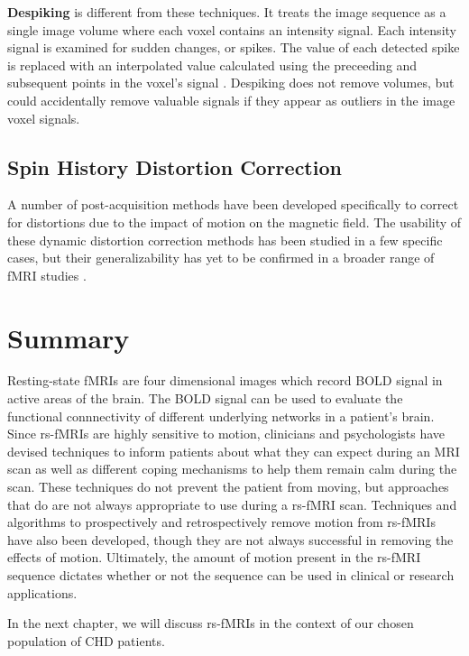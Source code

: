 \textbf{Despiking} is different from these techniques. It treats the image sequence as a single image volume where each voxel contains an intensity signal. Each intensity signal is examined for sudden changes, or spikes. The value of each detected spike is replaced with an interpolated value calculated using the preceeding and subsequent points in the voxel's signal \cite{Jo2013} \cite{Patel2014}. Despiking does not remove volumes, but could accidentally remove valuable signals if they appear as outliers in the image voxel signals.

\subsection{Spin History Distortion Correction}

A number of post-acquisition methods have been developed specifically to correct for distortions due to the impact of motion on the magnetic field. The usability of these dynamic distortion correction methods has been studied in a few specific cases, but their generalizability has yet to be confirmed in a broader range of fMRI studies \cite{Zaitsev2017}.

\section{Summary}

Resting-state fMRIs are four dimensional images which record BOLD signal in active areas of the brain. The BOLD signal can be used to evaluate the functional connnectivity of different underlying networks in a patient's brain. Since rs-fMRIs are highly sensitive to motion, clinicians and psychologists have devised techniques to inform patients about what they can expect during an MRI scan as well as different coping mechanisms to help them remain calm during the scan. These techniques do not prevent the patient from moving, but approaches that do are not always appropriate to use during a rs-fMRI scan. Techniques and algorithms to prospectively and retrospectively remove motion from rs-fMRIs have also been developed, though they are not always successful in removing the effects of motion. Ultimately, the amount of motion present in the rs-fMRI sequence dictates whether or not the sequence can be used in clinical or research applications.

In the next chapter, we will discuss rs-fMRIs in the context of our chosen population of CHD patients.